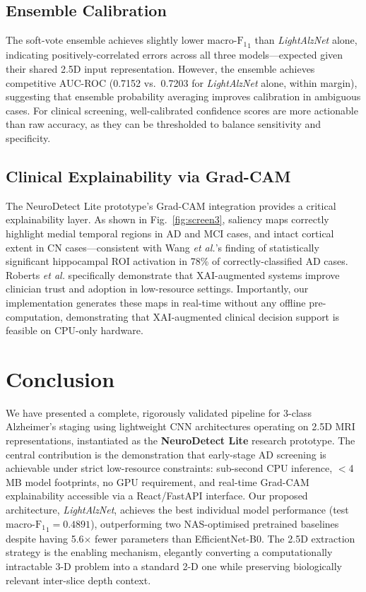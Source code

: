 \documentclass[conference]{IEEEtran}
\newcommand{\etal}{\textit{et al.}\xspace}
\newcommand{\modelname}{\textit{LightAlzNet}\xspace}
\newcommand{\F}{\mathrm{F_1}}
\begin{document}
\subsection{Ensemble Calibration}
The soft-vote ensemble achieves slightly lower macro-$\F_1$
than \modelname alone, indicating positively-correlated errors
across all three models---expected given their shared 2.5D
input representation. However, the ensemble achieves
competitive AUC-ROC (0.7152 vs.\ 0.7203 for \modelname alone,
within margin), suggesting that ensemble probability averaging
improves calibration in ambiguous cases. For clinical
screening, well-calibrated confidence scores are more
actionable than raw accuracy, as they can be thresholded to
balance sensitivity and specificity.

\subsection{Clinical Explainability via Grad-CAM}
The NeuroDetect Lite prototype's Grad-CAM integration provides
a critical explainability layer. As shown in
Fig.~\ref{fig:screen3}, saliency maps correctly highlight
medial temporal regions in AD and MCI cases, and intact
cortical extent in CN cases---consistent with Wang \etal's
\cite{wang2025gradcam} finding of statistically significant
hippocampal ROI activation in 78\% of correctly-classified AD
cases. Roberts \etal \cite{roberts2025} specifically
demonstrate that XAI-augmented systems improve clinician
trust and adoption in low-resource settings. Importantly, our
implementation generates these maps in real-time without any
offline pre-computation, demonstrating that XAI-augmented
clinical decision support is feasible on CPU-only hardware.

\section{Conclusion}
\label{sec:conclusion}

We have presented a complete, rigorously validated pipeline for
3-class Alzheimer's staging using lightweight CNN architectures
operating on 2.5D MRI representations, instantiated as the
\textbf{NeuroDetect Lite} research prototype. The central
contribution is the demonstration that early-stage AD screening
is achievable under strict low-resource constraints:
sub-second CPU inference, $<$4\,MB model footprints, no GPU
requirement, and real-time Grad-CAM explainability accessible
via a React/FastAPI interface. Our proposed architecture,
\modelname, achieves the best individual model performance
(test macro-$\F_1 = 0.4891$), outperforming two NAS-optimised
pretrained baselines despite having 5.6$\times$ fewer parameters
than EfficientNet-B0. The 2.5D extraction strategy is the
enabling mechanism, elegantly converting a computationally
intractable 3-D problem into a standard 2-D one while
preserving biologically relevant inter-slice depth context.
\end{document}
